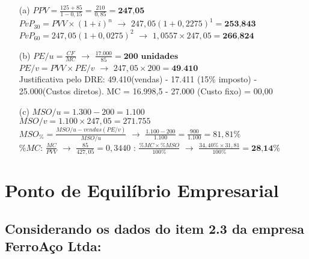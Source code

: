 \documentclass[report]{uftex}
\begin{document}
\begin{itemize}
	\item[(a)] $PPV = \frac{125 + 85}{1-0,15} = \frac{210}{0,85} = \textbf{247,05}$ \\
	
$PvP_{30} = PVV \times (1+i)^n$ $\rightarrow$ $247,05(1 + 0,2275)^1 = \textbf{253,843}$ \\

$PvP_{60} = 247,05(1+0,0275)^2$ $\rightarrow$ $1,0557 \times 247,05 = \textbf{266,824}$
	
	\item[(b)] $PE/u = \frac{CF}{MC}$ $\rightarrow$ $\frac{17.000}{85} = \textbf{200 unidades}$ \\
$PE/v = PVV \times PE/v$ $\rightarrow$ $247,05 \times 200 = \textbf{49.410}$ \\
Justificativa pelo DRE: 49.410(vendas) - 17.411 (15\% imposto) - 25.000(Custos diretos). MC = 16.998,5 - 27.000 (Custo fixo) = 00,00
	
	\item[(c)] $MSO/u = 1.300 - 200 = 1.100$ \\
$MSO/v = 1.100 \times 247,05 = 271.755$ \\
$MSO_\% = \frac{MSO/u - vendas(PE/v)}{MSO/u}$ $\rightarrow$ $\frac{1.100-200}{1.100} = \frac{900}{1.100} = 81,81\%$ \\
$\%MC$: $\frac{MC}{PVV}$ $\rightarrow$ $\frac{85}{427,05} = 0,3440$
: $\frac{\%MC \times \%MSO}{100\%}$ $\rightarrow$ $\frac{34,40\% \times 31,81}{100\%} = \textbf{28,14\%}$

\end{itemize}

\chapter{Ponto de Equilíbrio Empresarial}

\section{Considerando os dados do item 2.3 da empresa FerroAço Ltda:}
\end{document}
